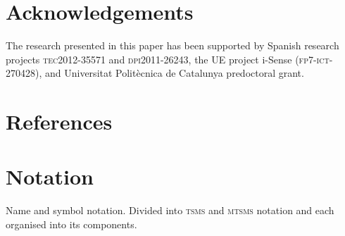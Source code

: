 \documentclass[
  review,
  twocolumn,
  5p,
]{elsarticle}
\newcommand{\acro}[1]{\textsc{\lowercase{#1}}}
\begin{document}













\section*{Acknowledgements}

The research presented in this paper has been supported by Spanish
research projects \textsc{tec2012-35571} and \textsc{dpi2011-26243},
the UE project i-Sense (\textsc{fp7-ict-270428}), and Universitat
Polit\`{e}cnica de Catalunya predoctoral grant.



\section*{References}



\glsaddall
\appendix
\section{Notation}
\label{sec:notation}


{\small
Name and symbol notation. Divided into
\acro{TSMS} and \acro{MTSMS} notation and each organised into its
components.
\printglossary[type=notation,style=estil-notation,title=]
}
\end{document}
